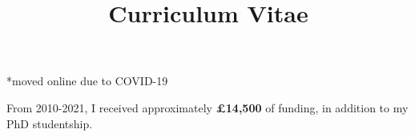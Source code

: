 \documentclass[a4paper,skipsamekey,11pt,british]{curve}
\title{Curriculum Vitae}
\begin{document}
\makeheaders[c]

%    
%

\newpage

\begin{footnotesize}  
*moved online due to COVID-19
\end{footnotesize}

From 2010-2021, I received approximately \textbf{£14,500} of funding, in addition to my PhD studentship. 
\par \hfill
{}

\end{document}
